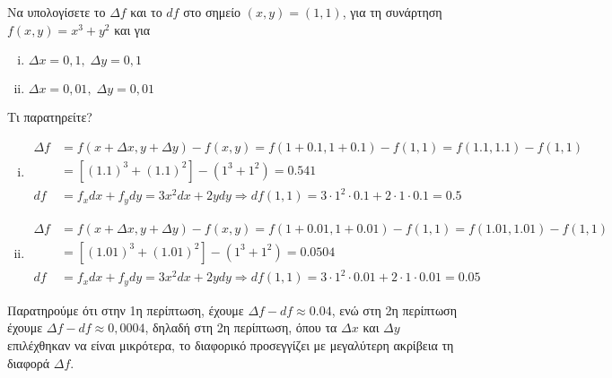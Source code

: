 \begin{example}
  Να υπολογίσετε το $ \Delta f $ και το $ df $ στο σημείο $ (x,y) = (1,1) $, 
  για τη συνάρτηση $ f(x,y) = x^{3}+y^{2} $ και για 
  \begin{enumerate}[i)]
    \item $ \Delta x = 0,1, \; \Delta y = 0,1 $
    \item $ \Delta x = 0,01, \; \Delta y = 0,01 $
  \end{enumerate}
  Τι παρατηρείτε?
\end{example}
\begin{solution}
\item {}
  \begin{enumerate}[i)]
    \item 
      \begin{align*} 
        \Delta f &= f(x+ \Delta x, y + \Delta y) - f(x,y) = f(1+0.1,1+0.1) - 
        f(1,1) = f(1.1,1.1) - f(1,1) \\ 
                 &= [(1.1)^{3}+(1.1)^{2}] - (1^{3}+1^{2}) = 0.541 \\
        df &= f_{x}dx + f_{y}dy  = 3x^{2} dx + 2y dy \Rightarrow df (1,1) = 
        3\cdot 1^{2} \cdot 0.1 + 2 \cdot 1 \cdot 0.1 = 0.5 
      \end{align*}
    \item 
      \begin{align*} 
        \Delta f &= f(x+ \Delta x, y + \Delta y) - f(x,y) = f(1+0.01,1+0.01) - 
        f(1,1) = f(1.01,1.01) - f(1,1) \\ 
                 &= [(1.01)^{3}+(1.01)^{2}] - (1^{3}+1^{2}) = 0.0504 \\
        df &= f_{x}dx + f_{y}dy  = 3x^{2} dx + 2y dy \Rightarrow df (1,1) = 
        3\cdot 1^{2} \cdot 0.01 + 2 \cdot 1 \cdot 0.01 = 0.05 
      \end{align*}
  \end{enumerate}
  Παρατηρούμε ότι στην 1η περίπτωση, έχουμε
  $ \Delta f - df \approx 0.04 $, ενώ στη 2η περίπτωση έχουμε $ \Delta f - df \approx 
  0,0004 $, δηλαδή στη 2η περίπτωση, όπου τα $ \Delta x $ και $ \Delta y $ επιλέχθηκαν 
  να είναι μικρότερα, το διαφορικό προσεγγίζει με μεγαλύτερη ακρίβεια τη διαφορά 
  $ \Delta f $.
\end{solution}

